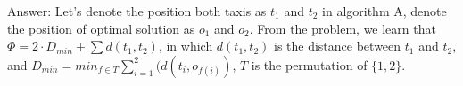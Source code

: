 \documentclass{article}
\begin{document}
Answer: Let's denote the position both taxis as $t_1$ and $t_2$ in algorithm A, denote the position of optimal solution as $o_1$ and $o_2$. From the problem, we learn that $\Phi = 2\cdot D_{min} + \sum d(t_1, t_2)$, in which $d(t_1, t_2)$ is the distance between $t_1$ and $t_2$, and $D_{min} = min_{f\in T}\sum_{i=1}^2(d(t_i, o_{f(i)})$, $T$ is the permutation of $\{1,2\}$.
\end{document}
